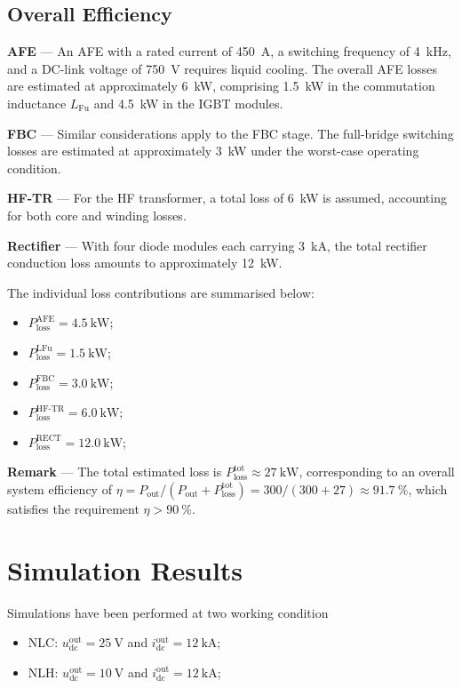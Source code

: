 \documentclass[11pt,a4paper]{scrartcl}
\begin{document}
\begin{onehalfspace}
\subsection{Overall Efficiency}

\noindent\textbf{AFE} --- An AFE with a rated current of \SI{450}{\ampere},
a switching frequency of \SI{4}{\kilo\hertz}, and a DC-link voltage of
\SI{750}{\volt} requires liquid cooling. The overall AFE losses are
estimated at approximately \SI{6}{\kilo\watt}, comprising \SI{1.5}{\kilo\watt}
in the commutation inductance $L_\text{Fu}$ and \SI{4.5}{\kilo\watt} in the
IGBT modules.

\noindent\textbf{FBC} --- Similar considerations apply to the FBC stage.
The full-bridge switching losses are estimated at approximately
\SI{3}{\kilo\watt} under the worst-case operating condition.

\noindent\textbf{HF-TR} --- For the HF transformer, a total loss of
\SI{6}{\kilo\watt} is assumed, accounting for both core and winding losses.

\noindent\textbf{Rectifier} --- With four diode modules each carrying
\SI{3}{\kilo\ampere}, the total rectifier conduction loss amounts to
approximately \SI{12}{\kilo\watt}.

\noindent The individual loss contributions are summarised below:
\begin{itemize}
	\item[--] $P_\text{loss}^\text{AFE}   = \SI{4.5}{\kilo\watt}$;
	\item[--] $P_\text{loss}^\text{LFu}   = \SI{1.5}{\kilo\watt}$;
	\item[--] $P_\text{loss}^\text{FBC}   = \SI{3.0}{\kilo\watt}$;
	\item[--] $P_\text{loss}^\text{HF-TR} = \SI{6.0}{\kilo\watt}$;
	\item[--] $P_\text{loss}^\text{RECT}  = \SI{12.0}{\kilo\watt}$;
\end{itemize}

\noindent\textbf{Remark} --- The total estimated loss is
$P_\text{loss}^\text{tot} \approx \SI{27}{\kilo\watt}$, corresponding to
an overall system efficiency of
$\eta = P_\text{out}/(P_\text{out}+P_\text{loss}^\text{tot})
= 300/(300+27) \approx \SI{91.7}{\percent}$,
which satisfies the requirement $\eta > \SI{90}{\percent}$.

\section{Simulation Results}\label{sec:sim}
Simulations have been performed at two working condition
\begin{itemize}
	\item[--] NLC: $u_\text{dc}^\text{out} = \SI{25}{\volt}$ and $i_\text{dc}^\text{out} = \SI{12}{\kilo\ampere}$;
	\item[--] NLH: $u_\text{dc}^\text{out} = \SI{10}{\volt}$ and $i_\text{dc}^\text{out} = \SI{12}{\kilo\ampere}$;
\end{itemize}


\end{onehalfspace}
\end{document}
